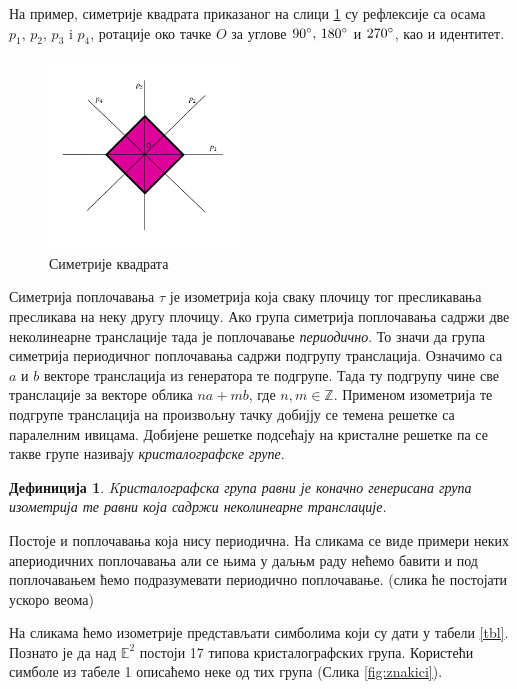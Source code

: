 \documentclass[12pt]{article}
\newtheorem{definition}[theorem]{\bf Дефиниција}
\begin{document}
На пример, симетрије квадрата приказаног на слици \ref{fig:kvadrat} су рефлексије са осама $p_1,\, p_2,\, p_3$ i $p_4$, ротације око тачке $O$ за углове $90\degree,\, 180\degree$ и $ 270\degree$, као и идентитет.
 
 
 
\begin{figure}[H]
\centering
\includegraphics[width=0.45\textwidth]{Simetrije_kocke.png}
\caption{Симетрије квадрата}
\label{fig:kvadrat}
\end{figure}





Симетрија поплочавања $\tau$ је изометрија која сваку плочицу тог пресликавања пресликава на неку другу плочицу.
Ако група симетрија поплочавања садржи две неколинеарне транслације тада је поплочавање \emph{периодично}. То значи да група симетрија периодичног поплочавања садржи подгрупу транслација. Означимо са $a$ и $b$ векторе транслација из генератора те подгрупе. Тада ту подгрупу чине све транслације за  векторе облика $na + mb$, где $n,m \in \mathbb{Z} $. Применом изометрија те подгрупе транслација на произвољну тачку добијју се темена решетке са паралелним ивицама. Добијене решетке подсећају на кристалне решетке па се такве групе називају \emph{кристалографске групе}.

\begin{definition}Kристалографска група равни је коначно генерисана група изометрија те равни која садржи неколинеарне транслације.
\end{definition}

Постоје и поплочавања која нису периодична. На сликама се виде примери неких апериодичних поплочавања али се њима у даљњм раду нећемо бавити и под поплочавањем ћемо подразумевати периодично поплочавање. (слика ће постојати ускоро веома)

На сликама ћемо изометрије представљати симболима који су дати у табели \ref{tbl}.
Познато је да над \(\mathbb{E}^2\) постоји 17 типова кристалографских група. Користећи симболе из табеле 1 описаћемо неке од тих група (Слика \ref{fig:znakici}).
\end{document}

